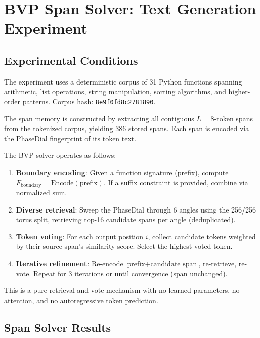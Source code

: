\section{BVP Span Solver: Text Generation Experiment}

\subsection{Experimental Conditions}
The experiment uses a deterministic corpus of 31 Python functions spanning arithmetic, list operations, string manipulation, sorting algorithms, and higher-order patterns. Corpus hash: \texttt{8e9f0fd8c2781890}.

The span memory is constructed by extracting all contiguous $L=8$-token spans from the tokenized corpus, yielding 386 stored spans. Each span is encoded via the PhaseDial fingerprint of its token text.

The BVP solver operates as follows:
\begin{enumerate}
    \item \textbf{Boundary encoding}: Given a function signature (prefix), compute $F_{\text{boundary}} = \text{Encode}(\text{prefix})$. If a suffix constraint is provided, combine via normalized sum.
    \item \textbf{Diverse retrieval}: Sweep the PhaseDial through 6 angles using the 256/256 torus split, retrieving top-16 candidate spans per angle (deduplicated).
    \item \textbf{Token voting}: For each output position $i$, collect candidate tokens weighted by their source span's similarity score. Select the highest-voted token.
    \item \textbf{Iterative refinement}: Re-encode $\text{prefix} + \text{candidate\_span}$, re-retrieve, re-vote. Repeat for 3 iterations or until convergence (span unchanged).
\end{enumerate}

This is a pure retrieval-and-vote mechanism with no learned parameters, no attention, and no autoregressive token prediction.

\subsection{Span Solver Results}


